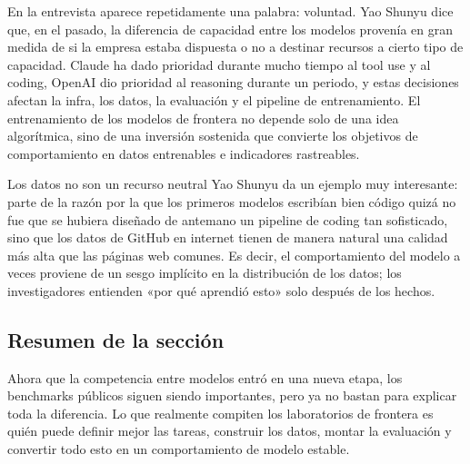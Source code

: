En la entrevista aparece repetidamente una palabra: voluntad. Yao Shunyu dice que, en el pasado, la diferencia de capacidad entre los modelos provenía en gran medida de si la empresa estaba dispuesta o no a destinar recursos a cierto tipo de capacidad. Claude ha dado prioridad durante mucho tiempo al tool use y al coding, OpenAI dio prioridad al reasoning durante un periodo, y estas decisiones afectan la infra, los datos, la evaluación y el pipeline de entrenamiento. El entrenamiento de los modelos de frontera no depende solo de una idea algorítmica, sino de una inversión sostenida que convierte los objetivos de comportamiento en datos entrenables e indicadores rastreables.

\begin{knowledgebox}{Los datos no son un recurso neutral}
Yao Shunyu da un ejemplo muy interesante: parte de la razón por la que los primeros modelos escribían bien código quizá no fue que se hubiera diseñado de antemano un pipeline de coding tan sofisticado, sino que los datos de GitHub en internet tienen de manera natural una calidad más alta que las páginas web comunes. Es decir, el comportamiento del modelo a veces proviene de un sesgo implícito en la distribución de los datos; los investigadores entienden «por qué aprendió esto» solo después de los hechos.
\end{knowledgebox}

\subsection{Resumen de la sección}

Ahora que la competencia entre modelos entró en una nueva etapa, los benchmarks públicos siguen siendo importantes, pero ya no bastan para explicar toda la diferencia. Lo que realmente compiten los laboratorios de frontera es quién puede definir mejor las tareas, construir los datos, montar la evaluación y convertir todo esto en un comportamiento de modelo estable.

